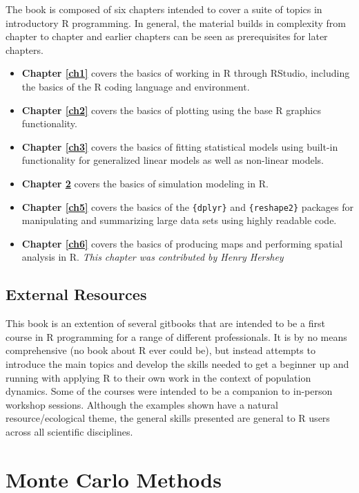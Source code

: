 \documentclass[]{book}
\providecommand{\tightlist}{%
  \setlength{\itemsep}{0pt}\setlength{\parskip}{0pt}}
\begin{document}
The book is composed of six chapters intended to cover a suite of topics in introductory R programming. In general, the material builds in complexity from chapter to chapter and earlier chapters can be seen as prerequisites for later chapters.

\begin{itemize}
\tightlist
\item
  \textbf{Chapter \ref{ch1}} covers the basics of working in R through RStudio, including the basics of the R coding language and environment.
\item
  \textbf{Chapter \ref{ch2}} covers the basics of plotting using the base R graphics functionality.
\item
  \textbf{Chapter \ref{ch3}} covers the basics of fitting statistical models using built-in functionality for generalized linear models as well as non-linear models.\\
\item
  \textbf{Chapter \ref{ch4}} covers the basics of simulation modeling in R.
\item
  \textbf{Chapter \ref{ch5}} covers the basics of the \texttt{\{dplyr\}} and \texttt{\{reshape2\}} packages for manipulating and summarizing large data sets using highly readable code.
\item
  \textbf{Chapter \ref{ch6}} covers the basics of producing maps and performing spatial analysis in R. \emph{This chapter was contributed by Henry Hershey}
\end{itemize}

\hypertarget{external-resources}{%
\section{External Resources}\label{external-resources}}

This book is an extention of several gitbooks that are intended to be a first course in R programming for a range of different professionals. It is by no means comprehensive (no book about R ever could be), but instead attempts to introduce the main topics and develop the skills needed to get a beginner up and running with applying R to their own work in the context of population dynamics. Some of the courses were intended to be a companion to in-person workshop sessions. Although the examples shown have a natural resource/ecological theme, the general skills presented are general to R users across all scientific disciplines.

\hypertarget{ch4}{%
\chapter{Monte Carlo Methods}\label{ch4}}
\end{document}
